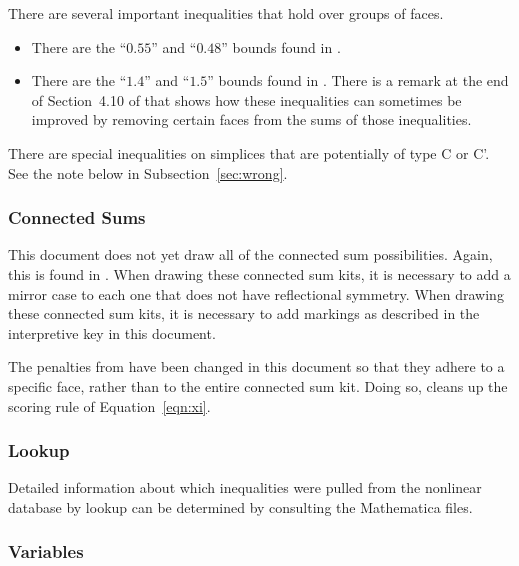 There are several important inequalities that hold over groups of
faces.

\begin{itemize}
  \item There are the ``$0.55$'' and ``$0.48$'' bounds found in
  \cite[Lemma 10.6,p.101]{DCG}.
  \item There are the ``$1.4$'' and ``$1.5$'' bounds found in
  \cite[Lemma~22.12,p.233]{DCG}.  There is a remark at the end of
  Section~4.10 of \cite[VI,p.37]{Hal98d} that shows how these
  inequalities can sometimes be improved by removing certain faces
  from the sums of those inequalities.
\end{itemize}


There are special inequalities on simplices that are potentially
of type C or C'.  See the note below in
Subsection~\ref{sec:wrong}.





\subsubsection{Connected Sums}

This document does not yet draw all of the connected sum possibilities.
Again, this is found in \cite[Sec.25.5--25.6,pp.249--251]{DCG}.
When drawing these connected sum kits, it is necessary to add a mirror
case to each one that does not have reflectional symmetry.  When
drawing these connected sum kits, it is necessary to add markings as
described in the interpretive key in this document.

The penalties from \cite{DCG} have been changed in this document
so that they adhere to a specific face, rather than to the entire
connected sum kit.  Doing so, cleans up the scoring rule of
Equation~\ref{eqn:xi}.




\subsubsection{Lookup}

Detailed information about which inequalities were pulled from the
nonlinear database by lookup can be determined by consulting the
Mathematica files.





\subsubsection{Variables}

